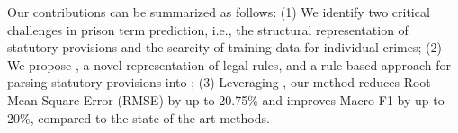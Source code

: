 Our contributions can be summarized as follows: (1) We identify two critical challenges in prison term prediction, i.e., the structural representation of statutory provisions and the scarcity of training data for individual crimes; (2) We propose \lawgraph, a novel representation of legal rules, and a rule-based approach for parsing statutory provisions into ; (3) Leveraging , our method reduces Root Mean Square Error (RMSE) by up to 20.75\% and improves Macro F1 by up to 20\%, compared to the state-of-the-art methods.



